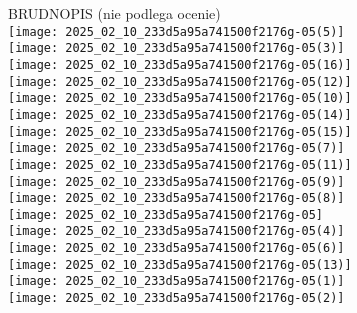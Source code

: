 \documentclass[10pt]{article}
\begin{document}
BRUDNOPIS (nie podlega ocenie)\\
\(\qquad\)\\
\texttt{[image: 2025\_02\_10\_233d5a95a741500f2176g-05(5)]}\\
\(\qquad\)\\
\texttt{[image: 2025\_02\_10\_233d5a95a741500f2176g-05(3)]}\\
\texttt{[image: 2025\_02\_10\_233d5a95a741500f2176g-05(16)]}\\
\texttt{[image: 2025\_02\_10\_233d5a95a741500f2176g-05(12)]}\\
\(\qquad\)\\
\texttt{[image: 2025\_02\_10\_233d5a95a741500f2176g-05(10)]}\\
\(\qquad\)\\
\(\qquad\)\\
\texttt{[image: 2025\_02\_10\_233d5a95a741500f2176g-05(14)]}\\
\texttt{[image: 2025\_02\_10\_233d5a95a741500f2176g-05(15)]}\\
\texttt{[image: 2025\_02\_10\_233d5a95a741500f2176g-05(7)]}\\
\texttt{[image: 2025\_02\_10\_233d5a95a741500f2176g-05(11)]}\\
\texttt{[image: 2025\_02\_10\_233d5a95a741500f2176g-05(9)]}\\
\(\qquad\)\\
\texttt{[image: 2025\_02\_10\_233d5a95a741500f2176g-05(8)]}\\
\texttt{[image: 2025\_02\_10\_233d5a95a741500f2176g-05]}\\
\texttt{[image: 2025\_02\_10\_233d5a95a741500f2176g-05(4)]}\\
\texttt{[image: 2025\_02\_10\_233d5a95a741500f2176g-05(6)]}\\
\(\qquad\)\\
\texttt{[image: 2025\_02\_10\_233d5a95a741500f2176g-05(13)]}\\
\texttt{[image: 2025\_02\_10\_233d5a95a741500f2176g-05(1)]}\\
\texttt{[image: 2025\_02\_10\_233d5a95a741500f2176g-05(2)]}
\end{document}
